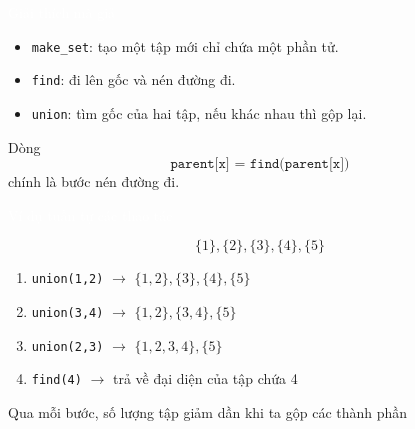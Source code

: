 \documentclass{beamer}
\newcommand{\hlblue}[1]{\textcolor{myblue}{#1}}
\newcommand{\hlgreen}[1]{\textcolor{mygreen}{#1}}
\newcommand{\hlred}[1]{\textcolor{myred}{#1}}
\newcommand{\hlwhite}[1]{\textcolor{white}{#1}}
\begin{document}

\begin{frame}{\hlwhite{Giải thích mã giả}}
\begin{itemize}
  \item \texttt{make\_set}: tạo một tập mới chỉ chứa một phần tử.
  \item \texttt{find}: đi lên gốc và nén đường đi.
  \item \texttt{union}: tìm gốc của hai tập, nếu khác nhau thì gộp lại.
\end{itemize}

\pause

\begin{tcolorbox}[title=\textbf{\hlgreen{Điểm quan trọng}}]
Dòng
\[
\texttt{parent[x] = find(parent[x])}
\]
chính là bước \hlred{nén đường đi}.
\end{tcolorbox}
\end{frame}


\begin{frame}{\hlwhite{Ví dụ tuần tự các thao tác}}
\begin{tcolorbox}[title=\textbf{\hlgreen{Ban đầu}}]
\[
\{1\},\{2\},\{3\},\{4\},\{5\}
\]
\end{tcolorbox}

\begin{enumerate}
  \item \texttt{union(1,2)} \(\rightarrow\) \(\{1,2\},\{3\},\{4\},\{5\}\)
  \item \texttt{union(3,4)} \(\rightarrow\) \(\{1,2\},\{3,4\},\{5\}\)
  \item \texttt{union(2,3)} \(\rightarrow\) \(\{1,2,3,4\},\{5\}\)
  \item \texttt{find(4)} \(\rightarrow\) trả về đại diện của tập chứa 4
\end{enumerate}

\pause

\begin{tcolorbox}
\centering
\hlblue{Qua mỗi bước, số lượng tập giảm dần khi ta gộp các thành phần}
\end{tcolorbox}
\end{frame}

\end{document}
